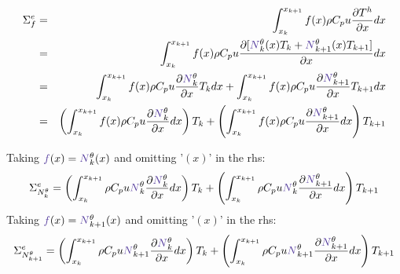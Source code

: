 \begin{eqnarray}
{\Sigma}_f^e 
&=&\int_{x_k}^{x_{k+1}} f(x) \rho C_p u\frac{\partial T^h}{\partial x} dx \nn\\
&=&\int_{x_k}^{x_{k+1}} f(x) \rho C_p u\frac{\partial 
[ {\color{Violet}N}_{k}^\theta(x) {T}_k + {\color{Violet}N}_{k+1}^\theta(x) {T}_{k+1} ] }{\partial x} dx \nn\\
&=&\int_{x_k}^{x_{k+1}} f(x) \rho C_p u\frac{\partial  {\color{Violet}N}_{k}^\theta }{\partial x} T_k dx 
+  \int_{x_k}^{x_{k+1}} f(x) \rho C_p u\frac{\partial  {\color{Violet}N}_{k+1}^\theta }{\partial x} T_{k+1} dx \nn\\
&=& \left(  \int_{x_k}^{x_{k+1}} f(x) \rho C_p u\frac{\partial  {\color{Violet}N}_{k}^\theta }{\partial x} dx \right) T_k 
+ \left( \int_{x_k}^{x_{k+1}} f(x) \rho C_p u\frac{\partial  {\color{Violet}N}_{k+1}^\theta }{\partial x} dx \right)T_{k+1}  \nn
\end{eqnarray}

Taking ${\color{Violet}f}(x)={\color{Violet}N}_k^\theta(x)$ and omitting '$(x)$' in the rhs:
\[
{\Sigma}_{N_k^\theta}^e=
\left( \int_{x_k}^{x_{k+1}} \rho C_p u {\color{Violet}N}_k^\theta \frac{\partial  {\color{Violet}N}_{k}^\theta }{\partial x} dx \right) T_k 
+ 
\left( \int_{x_k}^{x_{k+1}} \rho C_p u {\color{Violet}N}_k^\theta \frac{\partial  {\color{Violet}N}_{k+1}^\theta }{\partial x} dx \right)T_{k+1}  \nn
\]
Taking ${\color{Violet}f}(x)={\color{Violet}N}_{k+1}^\theta(x)$ and omitting '$(x)$' in the rhs:
\[
{\Sigma}_{N_{k+1}^\theta}^e=
\left( \int_{x_k}^{x_{k+1}} \rho C_p u {\color{Violet}N}_{k+1}^\theta \frac{\partial  {\color{Violet}N}_{k}^\theta }{\partial x} dx \right) T_k + 
\left( \int_{x_k}^{x_{k+1}} \rho C_p u {\color{Violet}N}_{k+1}^\theta \frac{\partial  {\color{Violet}N}_{k+1}^\theta }{\partial x} dx \right)T_{k+1}  \nn
\]



